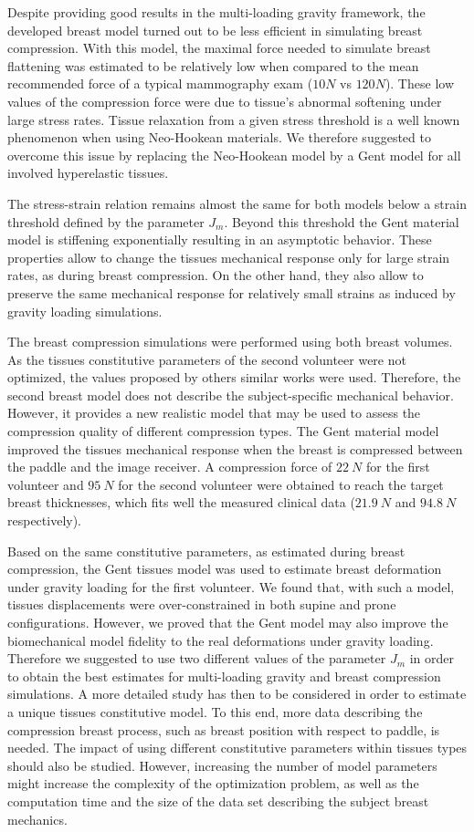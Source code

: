 Despite providing good results in the multi-loading gravity framework, the developed breast model turned out to be less efficient in simulating breast compression. With this model, the maximal force needed to simulate breast flattening was estimated to be relatively low when compared to the mean recommended force of a typical mammography exam ($10 N$ vs $120 N$). These low values of the compression force were due to tissue's abnormal softening under large stress rates. Tissue relaxation from a given stress threshold is a well known phenomenon when using Neo-Hookean materials. We therefore suggested to overcome this issue by replacing the Neo-Hookean model by a Gent model for all involved hyperelastic tissues.

The stress-strain relation remains almost the same for both models below a strain threshold defined by the parameter  $J_m$. Beyond this threshold the Gent material model is stiffening exponentially resulting in an asymptotic behavior. These properties allow to change the tissues mechanical response only for large strain rates, as during breast compression. On the other hand, they also allow to preserve the same mechanical response for relatively small strains as induced by gravity loading simulations.

The breast compression simulations were performed using both breast volumes. As the tissues constitutive parameters of the second volunteer were not optimized, the values proposed by others similar works were used. Therefore, the second breast model does not describe the subject-specific mechanical behavior. However, it provides  a new realistic model that may be used to assess the compression quality of different compression types. The Gent material model improved the tissues mechanical response when the breast is compressed between the paddle and the image receiver. A compression force of $22 \ N$ for the first volunteer and $95 \ N$ for the second volunteer were obtained to reach the target breast thicknesses, which fits well the measured clinical data ($21.9 \ N$ and $94.8 \ N$ respectively).  

Based on the same constitutive parameters, as estimated during breast compression, the Gent tissues model was used to estimate breast deformation under gravity loading for the first volunteer. We found that, with such a model, tissues displacements were over-constrained in both supine and prone configurations. However, we proved that the Gent model may also improve the biomechanical model fidelity to the real deformations under gravity loading. Therefore we suggested to use two different values of the parameter $J_m$ in order to obtain the best estimates for multi-loading gravity and breast compression simulations. A more detailed study has then to be considered in order to estimate a unique tissues constitutive model. To this end, more data describing the compression breast process, such as breast position with respect to paddle, is needed. The impact of using different constitutive parameters within tissues types should also be studied. However, increasing the number of model parameters might increase the complexity of the optimization problem, as well as the computation time and the size of the data set describing the subject breast mechanics.

